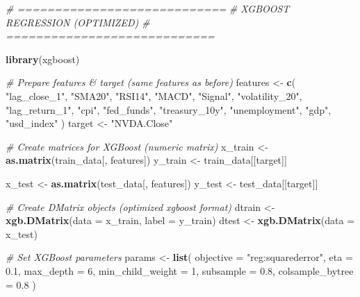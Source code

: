 \documentclass[
]{article}
\newenvironment{Shaded}{\begin{snugshade}}{\end{snugshade}}
\newcommand{\AttributeTok}[1]{\textcolor[rgb]{0.13,0.29,0.53}{#1}}
\newcommand{\CommentTok}[1]{\textcolor[rgb]{0.56,0.35,0.01}{\textit{#1}}}
\newcommand{\DecValTok}[1]{\textcolor[rgb]{0.00,0.00,0.81}{#1}}
\newcommand{\FloatTok}[1]{\textcolor[rgb]{0.00,0.00,0.81}{#1}}
\newcommand{\FunctionTok}[1]{\textcolor[rgb]{0.13,0.29,0.53}{\textbf{#1}}}
\newcommand{\NormalTok}[1]{#1}
\newcommand{\OtherTok}[1]{\textcolor[rgb]{0.56,0.35,0.01}{#1}}
\newcommand{\StringTok}[1]{\textcolor[rgb]{0.31,0.60,0.02}{#1}}
\begin{document}
\begin{Shaded}
\begin{Highlighting}[]
\CommentTok{\# ============================}
\CommentTok{\# XGBOOST REGRESSION (OPTIMIZED)}
\CommentTok{\# ============================}

\FunctionTok{library}\NormalTok{(xgboost)}

\CommentTok{\#  Prepare features \& target (same features as before)}
\NormalTok{features }\OtherTok{\textless{}{-}} \FunctionTok{c}\NormalTok{(}
  \StringTok{"lag\_close\_1"}\NormalTok{, }\StringTok{"SMA20"}\NormalTok{, }\StringTok{"RSI14"}\NormalTok{, }\StringTok{"MACD"}\NormalTok{, }\StringTok{"Signal"}\NormalTok{,}
  \StringTok{"volatility\_20"}\NormalTok{, }\StringTok{"lag\_return\_1"}\NormalTok{,}
  \StringTok{"cpi"}\NormalTok{, }\StringTok{"fed\_funds"}\NormalTok{, }\StringTok{"treasury\_10y"}\NormalTok{, }\StringTok{"unemployment"}\NormalTok{,}
  \StringTok{"gdp"}\NormalTok{, }\StringTok{"usd\_index"}
\NormalTok{)}
\NormalTok{target }\OtherTok{\textless{}{-}} \StringTok{"NVDA.Close"}

\CommentTok{\#  Create matrices for XGBoost (numeric matrix)}
\NormalTok{x\_train }\OtherTok{\textless{}{-}} \FunctionTok{as.matrix}\NormalTok{(train\_data[, features])}
\NormalTok{y\_train }\OtherTok{\textless{}{-}}\NormalTok{ train\_data[[target]]}

\NormalTok{x\_test }\OtherTok{\textless{}{-}} \FunctionTok{as.matrix}\NormalTok{(test\_data[, features])}
\NormalTok{y\_test }\OtherTok{\textless{}{-}}\NormalTok{ test\_data[[target]]}

\CommentTok{\#  Create DMatrix objects (optimized xgboost format)}
\NormalTok{dtrain }\OtherTok{\textless{}{-}} \FunctionTok{xgb.DMatrix}\NormalTok{(}\AttributeTok{data =}\NormalTok{ x\_train, }\AttributeTok{label =}\NormalTok{ y\_train)}
\NormalTok{dtest }\OtherTok{\textless{}{-}} \FunctionTok{xgb.DMatrix}\NormalTok{(}\AttributeTok{data =}\NormalTok{ x\_test)}

\CommentTok{\# Set XGBoost parameters}
\NormalTok{params }\OtherTok{\textless{}{-}} \FunctionTok{list}\NormalTok{(}
  \AttributeTok{objective =} \StringTok{"reg:squarederror"}\NormalTok{,}
  \AttributeTok{eta =} \FloatTok{0.1}\NormalTok{,}
  \AttributeTok{max\_depth =} \DecValTok{6}\NormalTok{,}
  \AttributeTok{min\_child\_weight =} \DecValTok{1}\NormalTok{,}
  \AttributeTok{subsample =} \FloatTok{0.8}\NormalTok{,}
  \AttributeTok{colsample\_bytree =} \FloatTok{0.8}
\NormalTok{)}


\end{Highlighting}
\end{Shaded}
\end{document}

